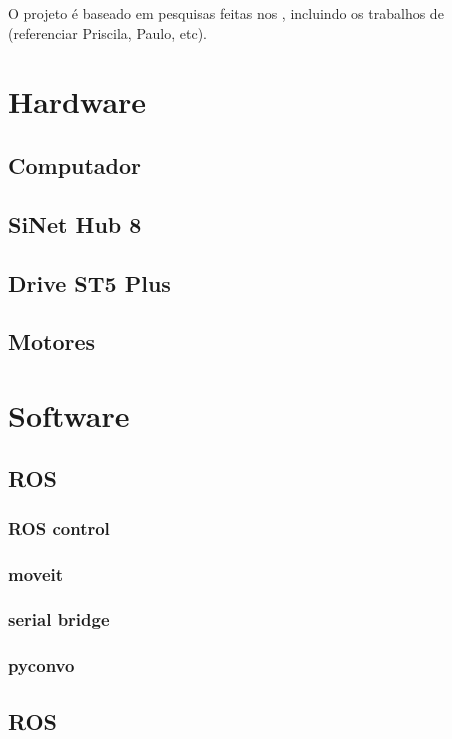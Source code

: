 \documentclass[12pt,a4paper,oneside,english, brazil]{abntex2}
\begin{document}
O projeto é baseado em pesquisas feitas nos , incluindo os trabalhos de (referenciar Priscila, Paulo, etc).

\chapter{Hardware}

\section{Computador}
\section{SiNet Hub 8}
\section{Drive ST5 Plus}
\section{Motores}

\chapter{Software}

\section{ROS}
\subsection{ROS control}
\subsection{moveit}
\subsection{serial bridge}
\subsection{pyconvo}
\section{ROS}




%

\end{document}
